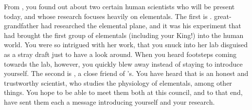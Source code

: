 \documentclass[char]{elementals}
\begin{document}
From \cDiplomat{}, you found out about two certain human scientists who will be present today, and whose research focuses heavily on elementals.  The first is \cGD{\intro}.  \cGD{\Their} great-grandfather had researched the elemental plane, and it was his experiment that had brought the first group of elementals (including your King!) into the human world.  You were so intrigued with her work, that you snuck into her lab disguised as a stray draft just to have a look around.  When you heard footsteps coming towards the lab, however, you quickly blew away instead of staying to introduce yourself.  The second is \cScientist{\intro}, a close friend of \cDiplomat{}'s.  You have heard that \cScientist{} is an honest and trustworthy scientist, who studies the physiology of elementals, among other things.  You hope to be able to meet them both at this council, and to that end, have sent them each a message introducing yourself and your research.
\end{document}
